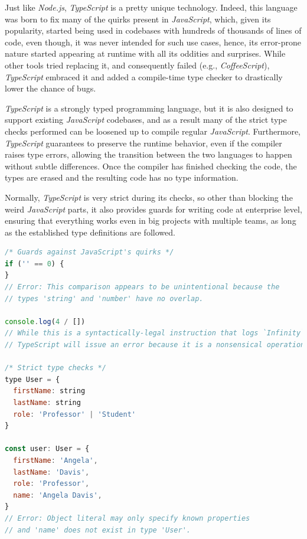 Just like \textit{Node.js}, \textit{TypeScript} is a pretty unique technology.
Indeed, this language was born to fix many of the quirks present in \textit{JavaScript},
which, given its popularity, started being used in codebases with hundreds of thousands of lines of code,
even though, it was never intended for such use cases, hence,
its error-prone nature started appearing at runtime with all its oddities and surprises.
While other tools tried replacing it, and consequently failed (e.g., \textit{CoffeeScript}),
\textit{TypeScript} embraced it and added a compile-time type checker to drastically lower the chance of bugs.

\textit{TypeScript} is a strongly typed programming language,
but it is also designed to support existing \textit{JavaScript} codebases,
and as a result many of the strict type checks performed can be loosened up to
compile regular \textit{JavaScript}. Furthermore, \textit{TypeScript} guarantees
to preserve the runtime behavior, even if the compiler raises type errors,
allowing the transition between the two languages to happen without subtle differences.
Once the compiler has finished checking the code, the types are erased and the resulting
code has no type information.

Normally, \textit{TypeScript} is very strict during its checks,
so other than blocking the weird \textit{JavaScript} parts,
it also provides guards for writing code at enterprise level,
ensuring that everything works even in big projects with multiple teams,
as long as the established type definitions are followed.

\begin{lstlisting}[language=javascript, caption={\textit{TypeScript}'s type checks}, label={lst:ts-checks}]
/* Guards against JavaScript's quirks */
if ('' == 0) {
}
// Error: This comparison appears to be unintentional because the
// types 'string' and 'number' have no overlap.

console.log(4 / [])
// While this is a syntactically-legal instruction that logs `Infinity`,
// TypeScript will issue an error because it is a nonsensical operation.

/* Strict type checks */
type User = {
  firstName: string
  lastName: string
  role: 'Professor' | 'Student'
}

const user: User = {
  firstName: 'Angela',
  lastName: 'Davis',
  role: 'Professor',
  name: 'Angela Davis',
}
// Error: Object literal may only specify known properties
// and 'name' does not exist in type 'User'.
\end{lstlisting}

